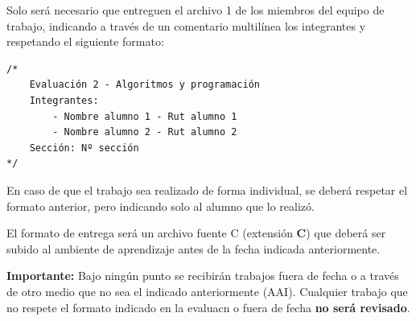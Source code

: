 \documentclass[]{article}
\begin{document}
    Solo será necesario que entreguen el archivo 1 de los miembros del equipo de trabajo, indicando a través de un comentario multilínea los integrantes y respetando el siguiente formato:\\

    \begin{listing}[H]
        \begin{verbatim}
/*
    Evaluación 2 - Algoritmos y programación
    Integrantes:
        - Nombre alumno 1 - Rut alumno 1
        - Nombre alumno 2 - Rut alumno 2
    Sección: Nº sección
*/
        \end{verbatim}
    \end{listing}

    En caso de que el trabajo sea realizado de forma individual, se deberá respetar el formato anterior, pero indicando solo al alumno que lo realizó.

    El formato de entrega será un archivo fuente C (extensión \textbf{C}) que deberá ser subido al ambiente de aprendizaje antes de la fecha indicada anteriormente. 

    \textbf{Importante:} Bajo ningún punto se recibirán trabajos fuera de fecha o a través de otro medio que no sea el indicado anteriormente (AAI). Cualquier trabajo que no respete el formato indicado en la evaluacn o fuera de fecha \textbf{no será revisado}. 
\end{document}
